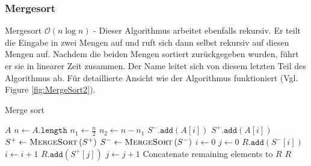 \documentclass[a4paper]{article}
\begin{document}
    \subsubsection{Mergesort}\label{Mergesort}
        Mergesort $\mathcal{O}(n \log n)$ - Dieser Algorithmus arbeitet ebenfalls rekursiv. Er teilt die Eingabe in zwei Mengen auf und ruft sich dann selbst rekursiv auf diesen Mengen auf. Nachdem die beiden Mengen sortiert zurückgegeben wurden, führt er sie in linearer Zeit zusammen. Der Name leitet sich von diesem letzten Teil des Algorithmus ab. Für detaillierte Ansicht wie der Algorithmus funktioniert (Vgl. Figure \ref{fig:MergeSort2}).        
        \begin{algorithm}[h]
            \caption{Merge sort}
            \label{alg:MergeSort}
            \begin{algorithmic}
              \State \Return $A$
              \EndIf
              \State $n \gets A\texttt{.length}$
              \State $n_1 \gets \frac n2$
              \State $n_2 \gets n-n_1$
              \State $S^-\texttt{.add}\left(A\left[i\right]\right)$
              \Else
              \State $S^+\texttt{.add}\left(A\left[i\right]\right)$
              \EndIf
              \EndFor
              \State $S^+ \gets \textsc{MergeSort}\left(S^+\right)$
              \State $S^- \gets \textsc{MergeSort}\left(S^-\right)$
              \State $i\gets 0$ 
              \State $j\gets 0$
              \State $R\texttt{.add}\left(S^-\left[i\right]\right)$
              \State $i \gets i+1$
              \Else
              \State $R\texttt{.add}\left(S^+\left[j\right]\right)$
              \State $j \gets j+1$
              \EndIf
              \EndWhile
              \State Concatenate remaining elements to $R$
              \State \Return $R$
              \EndFunction
            \end{algorithmic}
            \end{algorithm}
\end{document}
